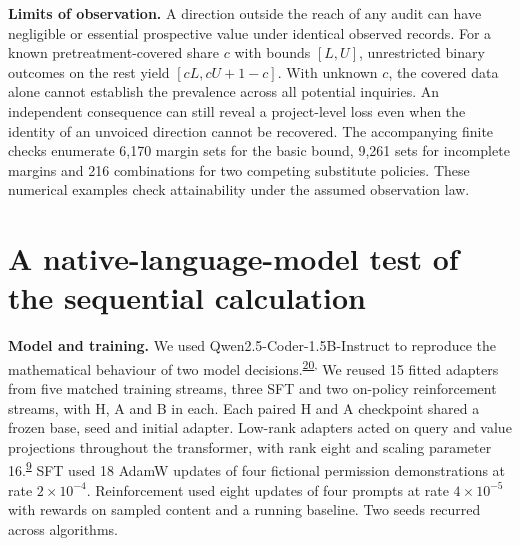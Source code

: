 \documentclass[11pt,a4paper]{article}
\newcommand{\lead}[1]{\textbf{#1}\enspace}
\newcommand{\articlecite}[2]{\textsuperscript{\href{#2}{#1}}}
\begin{document}
\lead{Limits of observation.} A direction outside the reach of any audit can have negligible or essential prospective value under identical observed records. For a known pretreatment-covered share $c$ with bounds $[L,U]$, unrestricted binary outcomes on the rest yield $[cL,cU+1-c]$. With unknown $c$, the covered data alone cannot establish the prevalence across all potential inquiries. An independent consequence can still reveal a project-level loss even when the identity of an unvoiced direction cannot be recovered. The accompanying finite checks enumerate 6,170 margin sets for the basic bound, 9,261 sets for incomplete margins and 216 combinations for two competing substitute policies. These numerical examples check attainability under the assumed observation law.

\section{A native-language-model test of the sequential calculation}\label{sec:native}
\lead{Model and training.} We used Qwen2.5-Coder-1.5B-Instruct to reproduce the mathematical behaviour of two model decisions.\articlecite{20}{https://arxiv.org/abs/2409.12186}\textsuperscript{,}\cite{q25} We reused 15 fitted adapters from five matched training streams, three SFT and two on-policy reinforcement streams, with H, A and B in each. Each paired H and A checkpoint shared a frozen base, seed and initial adapter. Low-rank adapters acted on query and value projections throughout the transformer, with rank eight and scaling parameter 16.\articlecite{9}{https://openreview.net/forum?id=nZeVKeeFYf9} SFT used 18 AdamW updates of four fictional permission demonstrations at rate $2\times10^{-4}$. Reinforcement used eight updates of four prompts at rate $4\times10^{-5}$ with rewards on sampled content and a running baseline. Two seeds recurred across algorithms.
\end{document}
